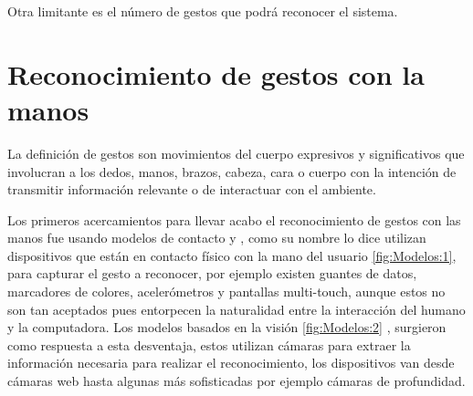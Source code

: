 Otra limitante es el número de gestos que podrá reconocer el sistema.



\section{Reconocimiento de gestos con la manos}\label{sec:ReconocimientoGestos} 

La definición de gestos \citep{Mitra2007} son movimientos del cuerpo expresivos y significativos que involucran a los dedos, manos, brazos, cabeza, cara o cuerpo con la intención de transmitir información relevante o de interactuar con el ambiente.

Los primeros acercamientos para llevar acabo el reconocimiento de gestos con las manos fue usando modelos de contacto \citep{Rautaray2012} y \citep{Nayakwadi2014}, como su nombre lo dice utilizan dispositivos que est\'an en contacto f\'isico con la mano del usuario \ref{fig:Modelos:1}, para capturar el gesto a reconocer, por ejemplo existen guantes de datos, marcadores de colores, acelerómetros y pantallas multi-touch, aunque estos no son tan aceptados pues entorpecen la naturalidad entre la interacción del humano y la computadora. Los modelos basados en la visión \ref{fig:Modelos:2} , surgieron como respuesta a esta desventaja, estos utilizan cámaras para extraer la información necesaria para realizar el reconocimiento, los dispositivos van desde cámaras web hasta algunas más sofisticadas por ejemplo c\'amaras de profundidad.   


